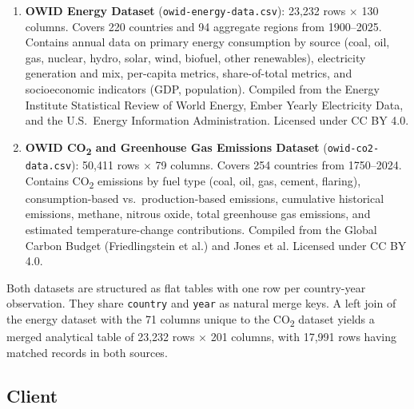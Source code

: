 \documentclass[10pt]{article}
\begin{document}
\begin{enumerate}
    \item \textbf{OWID Energy Dataset} (\texttt{owid-energy-data.csv}): 23{,}232 rows $\times$ 130 columns. Covers 220 countries and 94 aggregate regions from 1900--2025. Contains annual data on primary energy consumption by source (coal, oil, gas, nuclear, hydro, solar, wind, biofuel, other renewables), electricity generation and mix, per-capita metrics, share-of-total metrics, and socioeconomic indicators (GDP, population). Compiled from the Energy Institute Statistical Review of World Energy, Ember Yearly Electricity Data, and the U.S.\ Energy Information Administration. Licensed under CC BY 4.0.

    \item \textbf{OWID CO\textsubscript{2} and Greenhouse Gas Emissions Dataset} (\texttt{owid-co2-data.csv}): 50{,}411 rows $\times$ 79 columns. Covers 254 countries from 1750--2024. Contains CO\textsubscript{2} emissions by fuel type (coal, oil, gas, cement, flaring), consumption-based vs.\ production-based emissions, cumulative historical emissions, methane, nitrous oxide, total greenhouse gas emissions, and estimated temperature-change contributions. Compiled from the Global Carbon Budget (Friedlingstein et al.) and Jones et al. Licensed under CC BY 4.0.
\end{enumerate}

Both datasets are structured as flat tables with one row per country-year observation. They share \texttt{country} and \texttt{year} as natural merge keys. A left join of the energy dataset with the 71 columns unique to the CO\textsubscript{2} dataset yields a merged analytical table of 23{,}232 rows $\times$ 201 columns, with 17{,}991 rows having matched records in both sources.

\subsection{Client}
\end{document}
